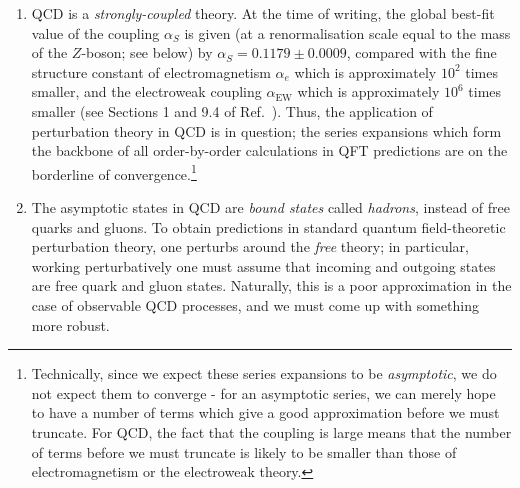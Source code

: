 \documentclass[withindex,glossary]{cam-thesis}
\begin{document}
\begin{enumerate}[label = (\arabic*)]
\item QCD is a \textit{strongly-coupled} theory. At the time of writing, the global best-fit value of the coupling $\alpha_S$ is given (at a renormalisation scale equal to the mass of the $Z$-boson; see below) by $\alpha_S = 0.1179 \pm 0.0009$, compared with the fine structure constant of electromagnetism $\alpha_e$ which is approximately $10^2$ times smaller, and the electroweak coupling $\alpha_{\text{EW}}$ which is approximately $10^6$ times smaller (see Sections 1 and 9.4 of Ref.~\cite{ParticleDataGroup:2022pth}). Thus, the application of perturbation theory in QCD is in question; the series expansions which form the backbone of all order-by-order calculations in QFT predictions are on the borderline of convergence.\footnote{Technically, since we expect these series expansions to be \textit{asymptotic}, we do not expect them to converge - for an asymptotic series, we can merely hope to have a number of terms which give a good approximation before we must truncate. For QCD, the fact that the coupling is large means that the number of terms before we must truncate is likely to be smaller than those of electromagnetism or the electroweak theory.} 
  
\item The asymptotic states in QCD are \textit{bound states} called \textit{hadrons}, instead of free quarks and gluons.  To obtain predictions in standard quantum field-theoretic perturbation theory, one perturbs around the \textit{free} theory; in particular, working perturbatively one must assume that incoming and outgoing states are free quark and gluon states. Naturally, this is a poor approximation in the case of observable QCD processes, and we must come up with something more robust.
\end{enumerate}
\end{document}

